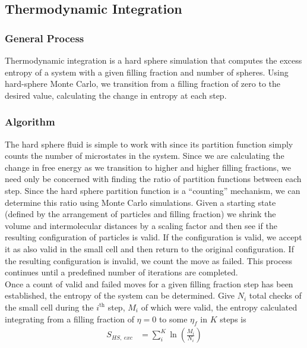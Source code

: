 \documentclass[12pt]{article}
\begin{document}
\subsection{Thermodynamic Integration}
\subsubsection{General Process}
Thermodynamic integration is a hard sphere simulation that computes the excess entropy of a system with a given filling fraction and number of spheres. Using hard-sphere Monte Carlo, we transition from a filling fraction of zero to the desired value, calculating the change in entropy at each step. 

\subsubsection{Algorithm}
The hard sphere fluid is simple to work with since its partition function simply counts the number of microstates in the system\cite{valeskethesis}. Since we are calculating the change in free energy as we transition to higher and higher filling fractions, we need only be concerned with finding the ratio of partition functions between each step. Since the hard sphere partition function is a ``counting'' mechanism, we can determine this ratio using Monte Carlo simulations. Given a starting state (defined by the arrangement of particles and filling fraction) we shrink the volume and intermolecular distances by a scaling factor and then see if the resulting configuration of particles is valid. If the configuration is valid, we accept it as also valid in the small cell and then return to the original configuration. If the resulting configuration is invalid, we count the move as failed. This process continues until a predefined number of iterations are completed.\\


Once a count of valid and failed moves for a given filling fraction step has been established, the entropy of the system can be determined. Give $N_i$ total checks of the small cell during the $i^{\text{th}}$ step, $M_i$ of which were valid, the entropy calculated integrating from a filling fraction of $\eta=0$ to some $\eta_f$ in $K$ steps is
\begin{align}
    S_{HS,~exc} &= \sum_i^K \ln\left(\frac{M_i}{N_i}\right)
\end{align}
\end{document}
